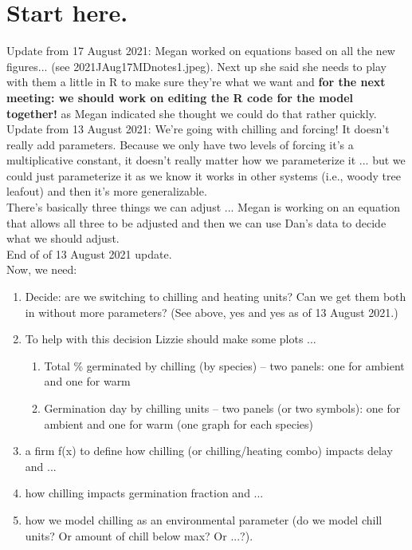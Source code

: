 \documentclass[11pt,letter]{article}
\begin{document}
\section{Start here.} 


Update from 17 August 2021: Megan worked on equations based on all the new figures... (see 2021JAug17MDnotes1.jpeg). Next up she said she needs to play with them a little in R to make sure they're what we want and {\bf for the next meeting: we should work on editing the R code for the model together!} as Megan indicated she thought we could do that rather quickly.\\

Update from 13 August 2021: We're going with chilling and forcing! It doesn't really add parameters. Because we only have two levels of forcing it's a multiplicative constant, it doesn't really matter how we parameterize it ... but we could just parameterize it as we know it works in other systems (i.e., woody tree leafout) and then it's more generalizable. \\

There's basically three things we can adjust ... Megan is working on an equation that allows all three to be adjusted and then we can use Dan's data to decide what we should adjust.\\

End of of 13 August 2021 update.\\

Now, we need:
\begin{enumerate}
\item Decide: are we switching to chilling and heating units? Can we get them both in without more parameters? (See above, yes and yes as of 13 August 2021.)
\item To help with this decision Lizzie should make some plots ... 
\begin{enumerate}
\item Total \% germinated by chilling (by species)  -- two panels: one for ambient and one for warm
\item Germination day by chilling units -- two panels (or two symbols): one for ambient and one for warm (one graph for each species)
\end{enumerate}
\item a firm f(x) to define how chilling (or chilling/heating combo) impacts delay and ...
\item how chilling impacts germination fraction and ...
\item how we model chilling as an environmental parameter (do we model chill units? Or amount of chill below max? Or ...?). 
\end{enumerate}
\end{document}
